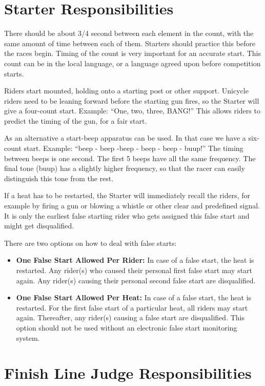 {\section{Starter Responsibilities\label{sec:track_starter}}

There should be about 3/4 second between each element in the count, with the same amount of time between each of them.
Starters should practice this before the races begin.
Timing of the count is very important for an accurate start.
This count can be in the local language, or a language agreed upon before competition starts.

Riders start mounted, holding onto a starting post or other support.
Unicycle riders need to be leaning forward before the starting gun fires, so the Starter will give a four-count start.
Example: ``One, two, three, BANG!''
This allows riders to predict the timing of the gun, for a fair start.

As an alternative a start-beep apparatus can be used.
In that case we have a six-count start.
Example: ``beep - beep -beep - beep - beep - buup!''
The timing between beeps is one second.
The first 5 beeps have all the same frequency.
The final tone (buup) has a slightly higher frequency, so that the racer can easily distinguish this tone from the rest.

If a heat has to be restarted, the Starter will immediately recall the riders, for example by firing a gun or blowing a whistle or other clear and predefined signal.
It is only the earliest false starting rider who gets assigned this false start and might get disqualified.

There are two options on how to deal with false starts:
\begin{itemize}
\item \textbf{One False Start Allowed Per Rider:}
In case of a false start, the heat is restarted.
Any rider(s) who caused their personal first false start may start again.
Any rider(s) causing their personal second false start are disqualified.
\item \textbf{One False Start Allowed Per Heat:} 
In case of a false start, the heat is restarted.
For the first false start of a particular heat, all riders may start again.
Thereafter, any rider(s) causing a false start are disqualified.
This option should not be used without an electronic false start monitoring system.
\end{itemize}

\section{Finish Line Judge Responsibilities}

}
